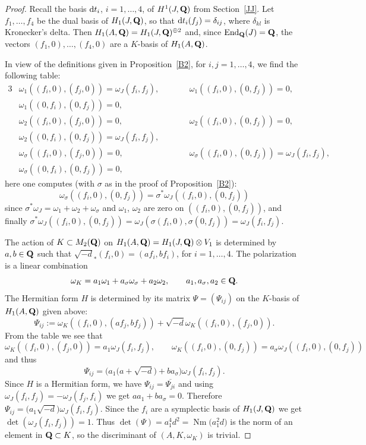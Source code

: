 \documentclass[pdftex]{sigma}
\numberwithin{equation}{section}
\begin{document}
\begin{proof}
Recall the basis ${\rm d} t_i$, $i=1,\dots, 4$, of $H^1(J,{\bf Q})$ from Section~\ref{JJ}. Let
$f_1,\dots,f_4$ be the dual basis of $H_1(J,{\bf Q})$, so that
${\rm d} t_i(f_j)=\delta_{ij}$, where $\delta_{kl}$ is
Kronecker's delta.
Then $H_1(A,{\bf Q})=H_1(J,{\bf Q})^{\oplus 2}$ and, since $\operatorname{End}_{\bf Q}(J)={\bf Q}$, the vectors
$(f_1,0),\dots,(f_4,0)$ are a $K$-basis of $H_1(A,{\bf Q})$.

In view of the definitions given in Proposition~\ref{B2},
for $i,j=1,\dots,4$, we find the following table:
\begin{alignat*}{3}
& \omega_1((f_i,0),(f_j,0))=\omega_J(f_i,f_j),\qquad && \omega_1((f_i,0),(0,f_j))=0,&\\
& \omega_1((0,f_i),(0,f_j))=0,&&&\\
&\omega_2((f_i,0),(f_j,0))=0,\qquad &&\omega_2((f_i,0),(0,f_j))=0,&\\
& \omega_2((0,f_i),(0,f_j))=\omega_J(f_i,f_j),&&& \\
& \omega_\sigma((f_i,0),(f_j,0))=0,\qquad && \omega_\sigma((f_i,0),(0,f_j))=\omega_J(f_i,f_j),&\\
& \omega_\sigma((0,f_i),(0,f_j))=0,&&&
\end{alignat*}
here one computes (with $\sigma$ as in the proof of Proposition~\ref{B2}):
\[
\omega_\sigma((f_i,0),(0,f_j)) = \sigma^*\omega_J((f_i,0),(0,f_j))
\]
since $\sigma^*\omega_J=\omega_1+\omega_2+\omega_\sigma$ and
$\omega_1$, $\omega_2$ are zero on $((f_i,0),(0,f_j))$,
and finally $\sigma^*\omega_J((f_i,0),(0,f_j))\!=\!\omega_J(\sigma(f_i,0),\sigma(0,f_j))=\omega_J(f_i,f_j)$.

The action of $K\subset M_2({\bf Q})$ on $H_1(A,{\bf Q})=H_1(J,{\bf Q})\otimes V_1$ is determined by
$a,b\in{\bf Q}$ such that $\sqrt{-d}_*(f_i,0)=(af_i,bf_i)$,
for $i=1,\dots,4$.
The polarization is a linear combination
\[
\omega_K = a_1\omega_1+a_\sigma \omega_\sigma+a_2\omega_2,\qquad a_1,a_\sigma,a_2\in{\bf Q}.
\]
The Hermitian form $H$ is determined by its matrix $\Psi=(\Psi_{ij})$
on the $K$-basis of $H_1(A,{\bf Q})$ given above:
\[
\Psi_{ij} := \omega_K((f_i,0),(af_j,bf_j)) + \sqrt{-d}\omega_K((f_i,0),(f_j,0)).
\]
From the table we see that
\[\omega_K((f_i,0),(f_j,0))=a_1\omega_J(f_i,f_j),\qquad
\omega_K((f_i,0),(0,f_j))=a_\sigma \omega_J((f_i,0),(0,f_j))
\]
and thus
\[
\Psi_{ij} = \big(a_1\big(a+\sqrt{-d}\big)+ba_\sigma\big)\omega_J(f_i,f_j).
\]
Since $H$ is a Hermitian form, we have $\Psi_{ij}=\overline{\Psi_{ji}}$ and using
$\omega_J(f_i,f_j)=-\omega_J(f_j,f_i)$ we get $aa_1+ba_\sigma=0$.
Therefore $\Psi_{ij}=\big(a_1\sqrt{-d}\big)\omega_J(f_i,f_j)$. Since the $f_i$ are a symplectic basis
of $H_1(J,{\bf Q})$ we get $\det(\omega_J(f_i,f_j))=1$. Thus $\det(\Psi)=a_1^4d^2=
\operatorname{Nm}\big(a_1^2d\big)$ is the norm of an element in ${\bf Q}\subset K$, so the discriminant of
$(A,K,\omega_K)$ is trivial.
\end{proof}
\end{document}
